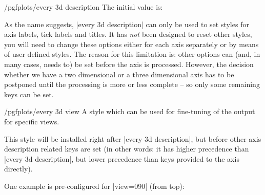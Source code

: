 {\begin{stylekey}{/pgfplots/every 3d description}
    The initial value is:
\begin{codeexample}
\end{codeexample}

    As the name suggests, |every 3d description| can only be used to set styles
    for axis labels, tick labels and titles. It has \emph{not} been designed to
    reset other styles, you will need to change these options either for each
    axis separately or by means of user defined styles. The reason for this
    limitation is: other options can (and, in many cases, needs to) be set
    before the axis is processed. However, the decision whether we have a two
    dimensional or a three dimensional axis has to be postponed until the
    processing is more or less complete -- so only some remaining keys can be
    set.
\end{stylekey}

\begin{stylekey}{/pgfplots/every 3d view }
    A style which can be used for fine-tuning of the output for specific views.

    This style will be installed right after |every 3d description|, but before
    other axis description related keys are set (in other words: it has higher
    precedence than |every 3d description|, but lower precedence than keys
    provided to the axis directly).

    One example is pre-configured for |view={0}{90}| (from top):
\begin{codeexample}
\end{codeexample}
\end{stylekey}


}
